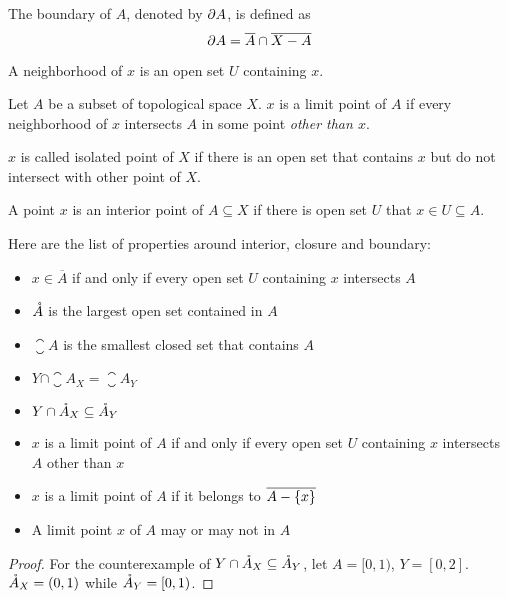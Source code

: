 \begin{definition}
    The boundary of $A$, denoted by $\partial A$, is defined as
    \begin{equation}
        \partial A = \overline{A} \cap \overline{X - A}
    \end{equation}
\end{definition}


\begin{definition}
    A neighborhood of $x$ is an open set $U$ containing $x$.
\end{definition}


\begin{definition}
    Let $A$ be a subset of topological space $X$. $x$ is a limit point of $A$ if every neighborhood of $x$ intersects $A$ in some point \emph{other than $x$}.
\end{definition}

\begin{definition}
    $x$ is called isolated point of $X$ if there is an open set that contains $x$ but do not intersect with other point of $X$.
\end{definition}

\begin{definition}
    A point $x$ is an interior point of $A \subseteq X$ if there is open set $U$ that $x \in U \subseteq A$.
\end{definition}


\begin{theorem}
    Here are the list of properties around interior, closure and boundary:
    \begin{itemize}
        \item $x \in \overline{A}$ if and only if every open set $U$ containing $x$ intersects $A$
        \item $\mathring{A}$ is the largest open set contained in $A$
        \item $\closure{A}$ is the smallest closed set that contains $A$
        \item $Y \cap \closure{A}_X = \closure{A}_Y$
        \item $Y \cap \mathring{A}_X \subseteq \mathring{A}_Y$
        \item $x$ is a limit point of $A$ if and only if every open set $U$ containing $x$ intersects $A$ other than $x$
        \item $x$ is a limit point of $A$ if it belongs to $\overline{A - \set{x}}$
        \item A limit point $x$ of $A$ may or may not in $A$
    \end{itemize}
\end{theorem}
\begin{proof}
    For the counterexample of $Y \cap \mathring{A}_X \subseteq \mathring{A}_Y$, let $A = [0,1)$, $Y = [0,2]$. $\mathring{A}_X = (0,1)$ while $\mathring{A}_Y = [0,1)$.
\end{proof}





